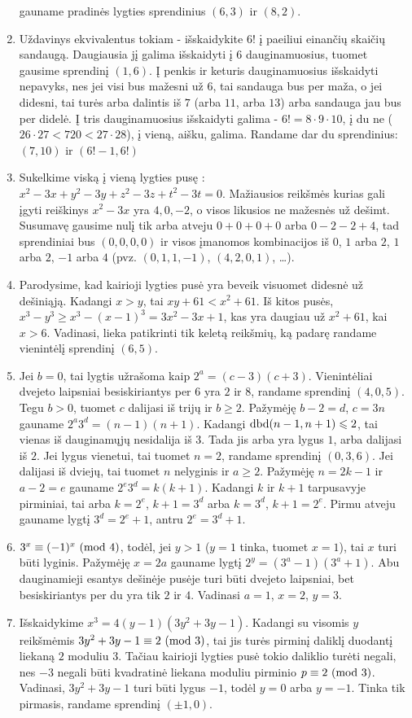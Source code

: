 \begin{enumerate}
    gauname pradinės lygties sprendinius $(6,3)$ ir $(8,2)$.
\item
    Uždavinys ekvivalentus tokiam - išskaidykite $6!$ į paeiliui einančių
    skaičių sandaugą. Daugiausia jį galima išskaidyti į $6$
    dauginamuosius, tuomet gausime sprendinį $(1,6)$. Į penkis ir keturis
    dauginamuosius išskaidyti nepavyks, nes jei visi bus mažesni už
    $6$, tai sandauga bus per maža, o jei didesni, tai turės arba dalintis
    iš $7$ (arba $11$, arba $13$) arba sandauga jau bus per didelė. Į tris
    dauginamuosius išskaidyti galima - $6! = 8\cdot 9 \cdot 10$, į du ne
    ($26\cdot27 < 720 < 27\cdot 28$), į vieną, aišku, galima. Randame dar
    du sprendinius: $(7,10)$ ir $(6!-1, 6!)$
\item
    Sukelkime viską į vieną lygties pusę : $x^2 - 3x + y^2 - 3y + z^2 - 3z
    + t^2 - 3t = 0$. Mažiausios reikšmės kurias gali įgyti reiškinys
    $x^2 - 3x$ yra $4, 0, -2$, o visos likusios ne mažesnės už dešimt.
    Susumavę gausime nulį tik arba atveju $0+0+0+0$ arba $0-2-2+4$, tad
    sprendiniai bus $(0,0,0,0)$ ir visos įmanomos kombinacijos iš $0$, $1$
    arba $2$, $1$ arba $2$, $-1$ arba $4$ (pvz. $(0,1,1,-1)$, $(4,2,0,1)$,
    \ldots).
\item
    Parodysime, kad kairioji lygties pusė yra beveik visuomet didesnė už
    dešiniąją. Kadangi $x>y$, tai $xy+61<x^2+61$. Iš kitos pusės,
    $x^3-y^3 \geq x^3 - (x-1)^3 = 3x^2 - 3x + 1$, kas yra daugiau už
    $x^2 + 61$, kai $x>6$. Vadinasi, lieka patikrinti tik keletą reikšmių,
    ką padarę randame vienintėlį sprendinį $(6,5)$.
\item
    Jei $b=0$, tai lygtis užrašoma kaip $2^a = (c-3)(c+3)$. Vienintėliai
    dvejeto laipsniai besiskiriantys per $6$ yra $2$ ir $8$, randame
    sprendinį $(4,0,5)$. Tegu $b>0$, tuomet $c$ dalijasi iš trijų ir
    $b\geq 2$. Pažymėję $b-2 = d$, $c = 3n$ gauname $2^a3^d =
    (n-1)(n+1)$. Kadangi $\operatorname{dbd}(n-1, n+1) \leqslant 2$, tai vienas iš dauginamųjų
    nesidalija iš $3$. Tada jis arba yra lygus $1$, arba dalijasi iš
    $2$. Jei lygus vienetui, tai tuomet $n=2$, randame sprendinį $(0,3,6)$.
    Jei dalijasi iš dviejų, tai tuomet $n$ nelyginis ir $a\geq 2$. Pažymėję
    $n=2k-1$ ir $a-2 = e$ gauname $2^e3^d = k(k+1)$. Kadangi $k$ ir
    $k+1$ tarpusavyje pirminiai, tai arba $k=2^e$, $k+1=3^d$ arba $k=3^d$,
    $k+1 = 2^e$. Pirmu atveju gauname lygtį $3^d = 2^e+1$, antru $2^e = 3^d
    + 1$.  
\item
    $3^x \equiv (-1)^x \ (\text{mod } 4)$, todėl, jei $y>1$ ($y=1$ tinka, tuomet
    $x=1$), tai $x$ turi būti lyginis. Pažymėję $x=2a$ gauname lygtį
    $2^y = (3^a-1)(3^a+1)$. Abu dauginamieji esantys dešinėje pusėje turi
    būti dvejeto laipsniai, bet besiskiriantys per du yra tik $2$ ir
    $4$. Vadinasi $a=1$, $x=2$, $y=3$.
\item
    Išskaidykime $x^3 = 4(y-1)(3y^2 + 3y -1)$. Kadangi su visomis $y$
    reikšmėmis $3y^2 + 3y - 1 \equiv 2 \ (\text{mod } 3)$, tai jis turės pirminį
    daliklį duodantį liekaną $2$ moduliu $3$. Tačiau kairioji lygties pusė
    tokio daliklio turėti negali, nes $-3$ negali būti kvadratinė liekana
    moduliu pirminio $p \equiv 2 \ (\text{mod } 3)$. Vadinasi, $3y^2 + 3y - 1$ turi
    būti lygus $-1$, todėl $y=0$ arba $y=-1$. Tinka tik pirmasis, randame
    sprendinį $(\pm 1,0)$. 
\end{enumerate} 
